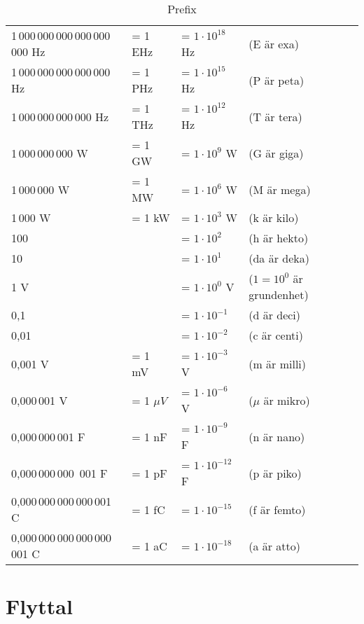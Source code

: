   \begin{table*}[b]
    \begin{center}
      \begin{tabular}{|llll|}
        \hline
        1\,000\,000\,000\,000\,000\,000 Hz & = 1 EHz & = \(1 \cdot 10^{18}\) Hz & (E är exa) \\
        1\,000\,000\,000\,000\,000 Hz & = 1 PHz & = \(1 \cdot 10^{15}\) Hz & (P är peta) \\
        1\,000\,000\,000\,000 Hz & = 1 THz & = \(1 \cdot 10^{12}\) Hz & (T är tera) \\
        1\,000\,000\,000 W & = 1 GW & = \(1 \cdot 10^9\) W & (G är giga) \\
        1\,000\,000 W & = 1 MW & = \(1 \cdot 10^6\) W & (M är mega) \\
        1\,000 W & = 1 kW & = \(1 \cdot 10^3\) W & (k är kilo) \\
        100 & & = \(1 \cdot 10^2\) & (h är hekto) \\
        10 & & = \(1 \cdot 10^1\) & (da är deka) \\
        1 V & & = \(1 \cdot 10^0\) V & (\(1 = 10^0\) är grundenhet) \\
        0,1 & & = \(1 \cdot 10^{-1}\) & (d är deci) \\
        0,01 & & = \(1 \cdot 10^{-2}\) & (c är centi) \\
        0,001 V & = 1 mV & = \(1 \cdot 10^{-3}\) V & (m är milli) \\
        0,000\,001 V & = 1 \(\mu V\) & = \(1 \cdot 10^{-6}\) V & (\(\mu \) är mikro) \\
        0,000\,000\,001 F & = 1 nF & = \(1 \cdot 10^{-9}\) F & (n är nano) \\
        0,000\,000\,000\, 001 F & = 1 pF & = \(1 \cdot 10^{-12}\) F & (p är piko) \\
        0,000\,000\,000\,000\,001 C & = 1 fC & = \(1 \cdot 10^{-15}\) & (f är femto) \\
        0,000\,000\,000\,000\,000\, 001 C & = 1 aC & = \(1 \cdot 10^{-18}\) & (a är atto) \\
        \hline
      \end{tabular}
    \end{center}
      \caption{Prefix}
      \label{tab:prefix}
\end{table*}


\section{Flyttal}

